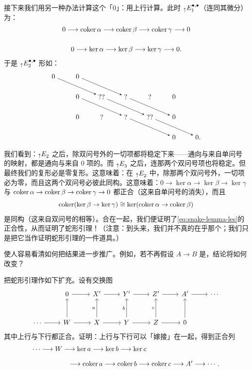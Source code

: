 接下来我们用另一种办法计算这个「$0$」：用上行\trOrientation{}计算\trSpectralSequence。此时 ${}_{\uparrow}E^{\bullet,\bullet}_{1}$（连同其微分）为：
\[
\begin{gathered}
0\longrightarrow\operatorname{coker}\alpha\longrightarrow\operatorname{coker}\beta\longrightarrow\operatorname{coker}\gamma\longrightarrow 0\\[14pt]
0\longrightarrow\ker\alpha\longrightarrow\ker\beta\longrightarrow\ker\gamma\longrightarrow 0.
\end{gathered}
\]
于是 ${}_{\uparrow}E^{\bullet,\bullet}_{2}$ 形如：
\[
\begin{tikzpicture}[>=stealth,x=1.25cm,y=1.05cm]
  \node (a0) at (0,2)  {$0$};
  \node (a1) at (1,2)  {$0$};
  \node (b0) at (1,1)  {$0$};
  \node (b1) at (2,1)  {$??$};
  \node (b2) at (3,1)  {$?$};
  \node (b3) at (4,1)  {$?$};
  \node (b4) at (5,1)  {$0$};
  \node (c0) at (1,0)  {$0$};
  \node (c1) at (2,0)  {$?$};
  \node (c2) at (3,0)  {$?$};
  \node (c3) at (4,0)  {$??$};
  \node (c4) at (5,0)  {$0$};
  \node (e0) at (5,-1) {$0$};
  \node (e1) at (6,-1) {$0.$};
  \draw[->] (a0) -- (b1);
  \draw[->] (a1) -- (b2);
  \draw[->] (b0) -- (c2);
  \draw[->] (b1) -- (c3);
  \draw[->] (b2) -- (c4);
  \draw[->] (c2) -- (e0);
  \draw[->] (c3) -- (e1);
\end{tikzpicture}
\]
我们看到：${}_{\uparrow}E^{}_{2}$ 之后，除双问号外的一切项都将稳定下来——通向与来自单问号的映射，都是通向与来自 $0$ 项的。而 ${}_{\uparrow}E^{}_{3}$ 之后，连那两个双问号项也将稳定。但最终我们的复形必是零复形。这意味着：在 ${}_{\uparrow}E^{}_{2}$ 中，除那两个双问号外，一切项必为零，而且这两个双问号必彼此同构。这意味着：$0\to\ker\alpha\to\ker\beta\to\ker\gamma$ 与 $\operatorname{coker}\alpha\to\operatorname{coker}\beta\to\operatorname{coker}\gamma\to 0$ 都正合（这来自单问号的消失），而且
\[
\operatorname{coker}(\ker\beta\to\ker\gamma)\cong\ker(\operatorname{coker}\alpha\to\operatorname{coker}\beta)
\]
是同构（这来自双问号的相等）。合在一起，我们便证明了\eqref{eq:snake-lemma-les}的正合性，从而证明了蛇形引理！（注意：到头来，我们并不真的在乎那个\trDoubleComplex；我们只是把它当作证明蛇形引理的一件道具。）

\trSpectralSequence{}使人容易看清如何把结果进一步推广。例如，若不再假设 $A\to B$ 是\trInjectiveMap，结论将如何改变？

\begin{exercise}\label{ex:grafting-snake-variant}
把蛇形引理作如下扩充。设有交换图
\[
\begin{tikzcd}[row sep=2.8em, column sep=2.4em]
 & 0 \ar[r] & X' \ar[r] & Y' \ar[r] & Z' \ar[r] & A' \ar[r] & \cdots \\
\cdots \ar[r] & W \ar[u] \ar[r] & X \ar[u,"a"] \ar[r] & Y \ar[u,"b"] \ar[r] & Z \ar[u,"c"] \ar[r] & 0 \ar[u] &
\end{tikzcd}
\]
其中上行与下行都正合。证明：上行与下行可以「嫁接」在一起，得到正合列
\[
\begin{array}{l}
\cdots\longrightarrow W\longrightarrow\ker a\longrightarrow\ker b\longrightarrow\ker c\\[10pt]
\hspace*{5.5em}\longrightarrow\operatorname{coker} a\longrightarrow\operatorname{coker} b\longrightarrow\operatorname{coker} c\longrightarrow A'\longrightarrow\cdots.
\end{array}
\]
\end{exercise}

